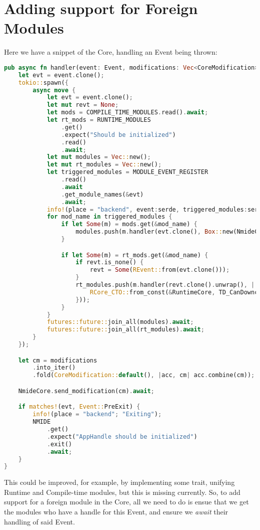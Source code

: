 \documentclass[runningheads]{llncs}
\begin{document}
\section{Adding support for Foreign Modules}

Here we have a snippet of the Core, handling an Event being thrown:

\begin{lstlisting}[language=Rust]
  pub async fn handler(event: Event, modifications: Vec<CoreModification>) {
    let evt = event.clone();
    tokio::spawn({
        async move {
            let evt = event.clone();
            let mut revt = None;
            let mods = COMPILE_TIME_MODULES.read().await;
            let rt_mods = RUNTIME_MODULES
                .get()
                .expect("Should be initialized")
                .read()
                .await;
            let mut modules = Vec::new();
            let mut rt_modules = Vec::new();
            let triggered_modules = MODULE_EVENT_REGISTER
                .read()
                .await
                .get_module_names(&evt)
                .await;
            info!(place = "backend", event:serde, triggered_modules:serde; "Handler, {:?} {:?}", event, triggered_modules);
            for mod_name in triggered_modules {
                if let Some(m) = mods.get(&mod_name) {
                    modules.push(m.handler(evt.clone(), Box::new(NmideCore)));
                }

                if let Some(m) = rt_mods.get(&mod_name) {
                    if revt.is_none() {
                        revt = Some(REvent::from(evt.clone()));
                    }
                    rt_modules.push(m.handler(revt.clone().unwrap(), || {
                        RCore_CTO::from_const(&RuntimeCore, TD_CanDowncast)
                    }));
                }
            }
            futures::future::join_all(modules).await;
            futures::future::join_all(rt_modules).await;
        }
    });

    let cm = modifications
        .into_iter()
        .fold(CoreModification::default(), |acc, cm| acc.combine(cm));

    NmideCore.send_modification(cm).await;

    if matches!(evt, Event::PreExit) {
        info!(place = "backend"; "Exiting");
        NMIDE
            .get()
            .expect("AppHandle should be initialized")
            .exit()
            .await;
    }
}
\end{lstlisting}

This could be improved, for example, by implementing some trait, unifying
Runtime and Compile-time modules, but this is missing currently. So, to add
support for a foreign module in the Core, all we need to do is ensue that we
get the modules who have a handle for this Event, and ensure we \textit{await}
their handling of said Event.
\end{document}
